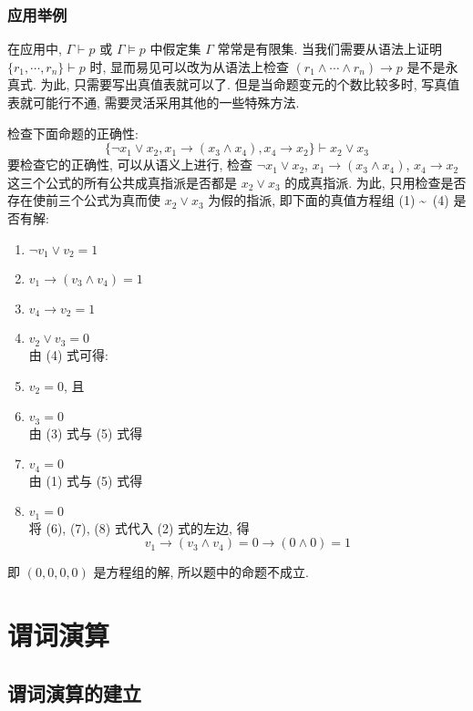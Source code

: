 \documentclass[
    color=black,
    device=normal,
    lang=cn
]{elegantnote}
\begin{document}
\subsubsection{应用举例}
在应用中, $\Gamma\vdash p$ 或 $\Gamma\vDash p$ 中假定集 $\Gamma$ 常常是有限集. 当我们需要从语法上证明 $\{r_1,\cdots,r_n\}\vdash p$ 时, 显而易见可以改为从语法上检查 $(r_1\land\cdots\land r_n)\to p$ 是不是永真式. 为此, 只需要写出真值表就可以了. 但是当命题变元的个数比较多时, 写真值表就可能行不通, 需要灵活采用其他的一些特殊方法.
\begin{example}
    检查下面命题的正确性:
    $$
        \{\lnot x_1\lor x_2,x_1\to (x_3\land x_4), x_4\to x_2\}\vdash x_2\lor x_3
    $$
    要检查它的正确性, 可以从语义上进行, 检查 $\lnot x_1\lor x_2$, $x_1\to (x_3\land x_4)$, $x_4\to x_2$ 这三个公式的所有公共成真指派是否都是 $x_2\lor x_3$ 的成真指派. 为此, 只用检查是否存在使前三个公式为真而使 $x_2\lor x_3$ 为假的指派, 即下面的真值方程组 (1) \textasciitilde \ (4) 是否有解:
    \begin{enumerate}[label = (\arabic*), listparindent = 2em, topsep = -1em]
        \item $\lnot v_1\lor v_2 = 1$
        \item $v_1\to (v_3\land v_4) = 1$
        \item $v_4\to v_2 = 1$
        \item $v_2\lor v_3 = 0$\\
              由 (4) 式可得:
        \item $v_2 = 0$, 且
        \item $v_3 = 0$\\
              由 (3) 式与 (5) 式得
        \item $v_4 = 0$\\
              由 (1) 式与 (5) 式得
        \item $v_1 = 0$\\
              将 (6), (7), (8) 式代入 (2) 式的左边, 得
              $$
                  v_1 \to (v_3\land v_4) = 0\to (0\land 0) = 1
              $$
    \end{enumerate}
    即 $(0,0,0,0)$ 是方程组的解, 所以题中的命题不成立.
\end{example}
\newpage
\section{谓词演算}
\subsection{谓词演算的建立}
\end{document}
